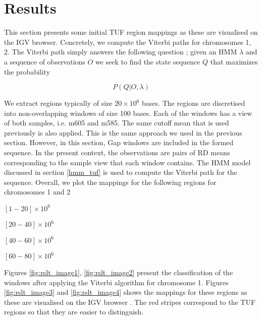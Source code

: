 \documentclass[12pt]{article}
\let\tempone\itemize
\let\temptwo\enditemize
\renewenvironment{itemize}{\tempone\setlength{\itemsep}{0pt}}{\temptwo}
\begin{document}
\section{Results}
\label{results}

This section presents some initial TUF region mappings as these are visualised on the IGV browser.
Concretely, we compute  the Viterbi paths for chromosomes 1, 2. 
The Viterbi path simply answers the following 
question \cite{rabiner2009}; given an HMM $\lambda$ and a sequence of observations $O$ we seek to find the state sequence  $Q$ that maximizes the probability 

\begin{equation}
P(Q|O, \lambda)
\end{equation}

We extract regions typically of size $20\times 10^6$ bases. The regions are 
discretised into non-overlapping  windows of size 100 bases. Each of the windows has a view of both samples, i.e. m605 and m585.  The same cutoff mean that is used previously is also applied.
This is the same approach we used in the previous section. However, in this section, Gap windows are included in the formed sequence. In the present context, the observations are pairs of RD means corresponding to the sample view that each window contains. The HMM model discussed in section \ref{hmm_tuf} is used to compute the Viterbi path for the sequence. Overall, we plot the mappings for the following regions for chromosomes 1 and 2 

\begin{itemize}
	\item $[1-20]\times 10^6$
	\item $[20-40]\times 10^6$
	\item $[40-60]\times 10^6$
	\item $[60-80]\times 10^6$
\end{itemize} 

Figures \ref{fig:rslt_image1}, \ref{fig:rslt_image2} present the classification of the windows after applying the Viterbi algorithm for chromosome 1. 
Figures \ref{fig:rslt_image3} and \ref{fig:rslt_image4} shows the mappings for these regions as these are visualised on the IGV browser \cite{2011Robinson}. The red stripes correspond to the TUF regions so that they are easier to distinguish. 

\end{document}
